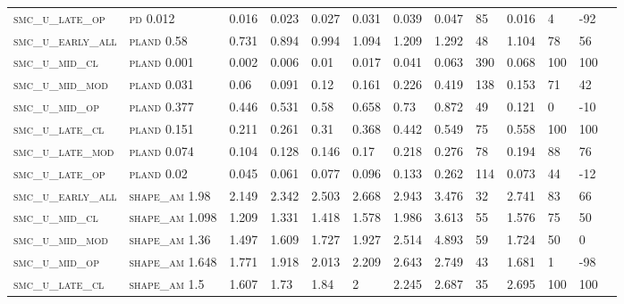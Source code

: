 \begin{landscape}
\begin{center}
\begin{footnotesize}
\begin{longtable}{lllllllllllll}
\textsc{smc\_u\_late\_op  } & \textsc{pd        }   0.012    & 0.016    & 0.023    & 0.027    & 0.031    & 0.039    & 0.047    & 85   & 0.016    & 4   & -92  \\
\textsc{smc\_u\_early\_all} & \textsc{pland     }   0.58     & 0.731    & 0.894    & 0.994    & 1.094    & 1.209    & 1.292    & 48   & 1.104    & 78  & 56   \\
\textsc{smc\_u\_mid\_cl   } & \textsc{pland     }   0.001    & 0.002    & 0.006    & 0.01     & 0.017    & 0.041    & 0.063    & 390  & 0.068    & 100 & 100  \\
\textsc{smc\_u\_mid\_mod  } & \textsc{pland     }   0.031    & 0.06     & 0.091    & 0.12     & 0.161    & 0.226    & 0.419    & 138  & 0.153    & 71  & 42   \\
\textsc{smc\_u\_mid\_op   } & \textsc{pland     }   0.377    & 0.446    & 0.531    & 0.58     & 0.658    & 0.73     & 0.872    & 49   & 0.121    & 0   & -10  \\
\textsc{smc\_u\_late\_cl  } & \textsc{pland     }   0.151    & 0.211    & 0.261    & 0.31     & 0.368    & 0.442    & 0.549    & 75   & 0.558    & 100 & 100  \\
\textsc{smc\_u\_late\_mod } & \textsc{pland     }   0.074    & 0.104    & 0.128    & 0.146    & 0.17     & 0.218    & 0.276    & 78   & 0.194    & 88  & 76   \\
\textsc{smc\_u\_late\_op  } & \textsc{pland     }   0.02     & 0.045    & 0.061    & 0.077    & 0.096    & 0.133    & 0.262    & 114  & 0.073    & 44  & -12  \\
\textsc{smc\_u\_early\_all} & \textsc{shape\_am }   1.98     & 2.149    & 2.342    & 2.503    & 2.668    & 2.943    & 3.476    & 32   & 2.741    & 83  & 66   \\
\textsc{smc\_u\_mid\_cl   } & \textsc{shape\_am }   1.098    & 1.209    & 1.331    & 1.418    & 1.578    & 1.986    & 3.613    & 55   & 1.576    & 75  & 50   \\
\textsc{smc\_u\_mid\_mod  } & \textsc{shape\_am }   1.36     & 1.497    & 1.609    & 1.727    & 1.927    & 2.514    & 4.893    & 59   & 1.724    & 50  & 0    \\
\textsc{smc\_u\_mid\_op   } & \textsc{shape\_am }   1.648    & 1.771    & 1.918    & 2.013    & 2.209    & 2.643    & 2.749    & 43   & 1.681    & 1   & -98  \\
\textsc{smc\_u\_late\_cl  } & \textsc{shape\_am }   1.5      & 1.607    & 1.73     & 1.84     & 2        & 2.245    & 2.687    & 35   & 2.695    & 100 & 100  \\

\end{longtable}
\end{footnotesize}
\end{center}
\end{landscape}
